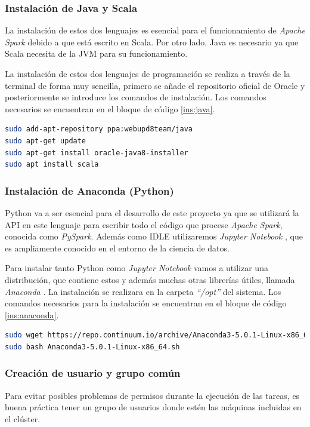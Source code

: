 \subsubsection{Instalación de Java y Scala}
La instalación de estos dos lenguajes es esencial para el funcionamiento de \textit{Apache Spark} debido a que está escrito en Scala. Por otro lado, Java es necesario ya que Scala \cite{scala} necesita de la \gls{JVM} para su funcionamiento.

La instalación de estos dos lenguajes de programación se realiza a través de la terminal de forma muy sencilla, primero se añade el repositorio oficial de Oracle \cite{descargaJava} y posteriormente se introduce los comandos de instalación.
Los comandos necesarios se encuentran en el bloque de código \ref{ins:java}.

\begin{lstlisting}[label=ins:java,language=sh,frame=single, caption=Instalación de Java y Scala.]
sudo add-apt-repository ppa:webupd8team/java
sudo apt-get update
sudo apt-get install oracle-java8-installer
sudo apt install scala
\end{lstlisting}

\subsubsection{Instalación de Anaconda (Python)}
Python va a ser esencial para el desarrollo de este proyecto ya que se utilizará la \gls{API} en este lenguaje para escribir todo el código que procese \textit{Apache Spark}, conocida como \textit{PySpark}. Además como \gls{IDLE} utilizaremos \textit{Jupyter Notebook} \cite{jupyter}, que es ampliamente conocido en el entorno de la ciencia de datos.

Para instalar tanto Python como \textit{Jupyter Notebook} vamos a utilizar una distribución, que contiene estos y además muchas otras librerías útiles, llamada \textit{Anaconda} \cite{anaconda}. La instalación se realizara en la carpeta \textit{``/opt''} del sistema.
Los comandos necesarios para la instalación se encuentran en el bloque de código \ref{ins:anaconda}.

\begin{lstlisting}[label=ins:anaconda,language=sh,frame=single, caption=Descarga e instalación de Anaconda.]
sudo wget https://repo.continuum.io/archive/Anaconda3-5.0.1-Linux-x86_64.sh
sudo bash Anaconda3-5.0.1-Linux-x86_64.sh
\end{lstlisting}

\subsubsection{Creación de usuario y grupo común \label{grupoComun}}
Para evitar posibles problemas de permisos durante la ejecución de las tareas, es buena práctica tener un grupo de usuarios donde estén las máquinas incluidas en el clúster.

